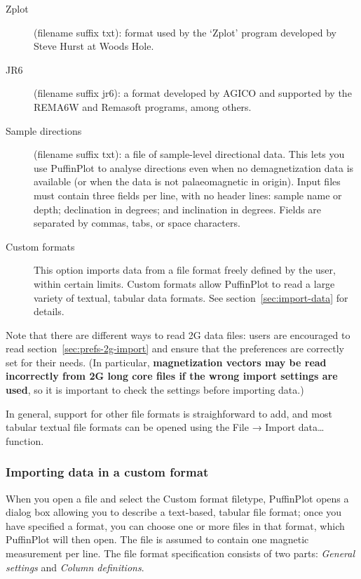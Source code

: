 \documentclass[a4paper,british]{article}
\newcommand{\ppcmd}[1]{\textsf{#1}} %
\newcommand{\caps}[1]{\MakeTextUppercase{#1}} %
\newcommand{\submenu}{ \textrm{→} }
\begin{document}
\begin{description}
\item[Zplot] (filename suffix \ppcmd{txt}): format used by the 
  `Zplot' program developed by Steve Hurst at Woods Hole.

\item[JR6] (filename suffix \ppcmd{jr6}): a format developed by AGICO
  and supported by the REMA6W and Remasoft programs, among others.
  
\item[Sample directions] (filename suffix \ppcmd{txt}): a file of
  sample-level directional data. This lets you use PuffinPlot to analyse
  directions even when no demagnetization data is available (or when the
  data is not palaeomagnetic in origin). Input files must contain three
  fields per line, with no header lines: sample name or depth;
  declination in degrees; and inclination in degrees. Fields are
  separated by commas, tabs, or space characters.

\item[Custom formats] This option imports data from a file format freely
  defined by the user, within certain limits. Custom formats allow
  PuffinPlot to read a large variety of textual, tabular data formats.
  See section~\ref{sec:import-data} for details.

\end{description}

\noindent Note that there are different ways to read 2\caps{g} data
files: users are encouraged to read section~\ref{sec:prefs-2g-import}
and ensure that the preferences are correctly set for their needs. (In
particular, \textbf{magnetization vectors may be read incorrectly from
  2G long core files if the wrong import settings are used}, so it is
important to check the settings before importing data.)

In general, support for other file formats is straighforward to add, and most
tabular textual file formats can be opened using the \ppcmd{File\submenu
  Import data\ldots} function.

\subsubsection{\label{sec:import-data}Importing data in a custom format}

When you open a file and select the \ppcmd{Custom format} filetype,
PuffinPlot opens a dialog box allowing you to describe a text-based,
tabular file format; once you have specified a format, you can choose
one or more files in that format, which PuffinPlot will then open. The
file is assumed to contain one magnetic measurement per line. The file
format specification consists of two parts: \emph{General settings} and
\emph{Column definitions}.
\end{document}
